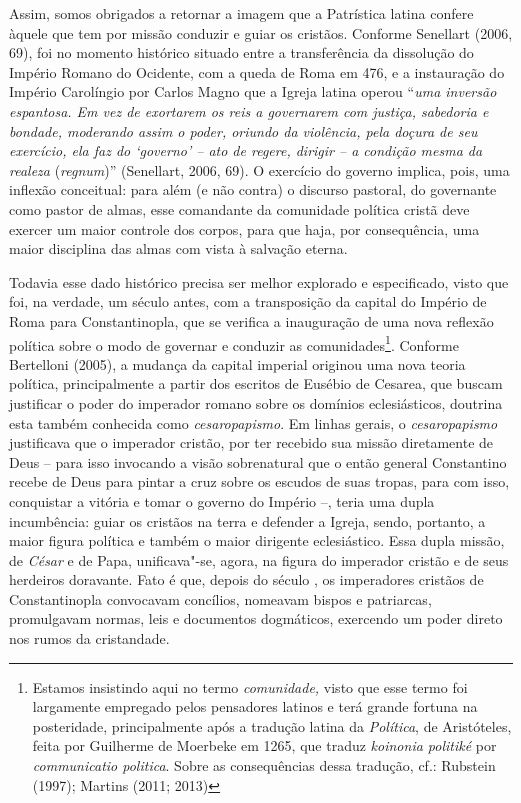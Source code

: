 Assim, somos obrigados a retornar a imagem que a Patrística latina
confere àquele que tem por missão conduzir e guiar os cristãos. Conforme
Senellart (2006, 69), foi no momento histórico situado entre a
transferência da dissolução do Império Romano do Ocidente, com a queda
de Roma em 476, e a instauração do Império Carolíngio por Carlos Magno
que a Igreja latina operou ``\emph{uma inversão espantosa. Em vez de
exortarem os reis a governarem com justiça, sabedoria e bondade,
moderando assim o poder, oriundo da violência, pela doçura de seu
exercício, ela faz do `governo' -- ato de regere, dirigir -- a condição
mesma da realeza} (\emph{regnum})'' (Senellart, 2006, 69). O exercício
do governo implica, pois, uma inflexão conceitual: para além (e não
contra) o discurso pastoral, do governante como pastor de almas, esse
comandante da comunidade política cristã deve exercer um maior controle
dos corpos, para que haja, por consequência, uma maior disciplina das
almas com vista à salvação eterna.

Todavia esse dado histórico precisa ser melhor explorado e especificado,
visto que foi, na verdade, um século antes, com a transposição da
capital do Império de Roma para Constantinopla, que se verifica a
inauguração de uma nova reflexão política sobre o modo de governar e
conduzir as comunidades\footnote{Estamos insistindo aqui no termo
  \emph{comunidade,} visto que esse termo foi largamente empregado pelos
  pensadores latinos e terá grande fortuna na posteridade,
  principalmente após a tradução latina da \emph{Política}, de
  Aristóteles, feita por Guilherme de Moerbeke em 1265, que traduz
  \emph{koinonia politiké} por \emph{communicatio politica}. Sobre as
  consequências dessa tradução, cf.: Rubstein (1997); Martins (2011;
  2013)}. Conforme Bertelloni (2005), a mudança da capital imperial
originou uma nova teoria política, principalmente a partir dos escritos
de Eusébio de Cesarea, que buscam justificar o poder do imperador romano
sobre os domínios eclesiásticos, doutrina esta também conhecida como
\emph{cesaropapismo}. Em linhas gerais, o \emph{cesaropapismo}
justificava que o imperador cristão, por ter recebido sua missão
diretamente de Deus -- para isso invocando a visão sobrenatural que o
então general Constantino recebe de Deus para pintar a cruz sobre os
escudos de suas tropas, para com isso, conquistar a vitória e tomar o
governo do Império --, teria uma dupla incumbência: guiar os cristãos na
terra e defender a Igreja, sendo, portanto, a maior figura política e
também o maior dirigente eclesiástico. Essa dupla missão, de
\emph{César} e de Papa, unificava"-se, agora, na figura do imperador
cristão e de seus herdeiros doravante. Fato é que, depois do século ,
os imperadores cristãos de Constantinopla convocavam concílios, nomeavam
bispos e patriarcas, promulgavam normas, leis e documentos dogmáticos,
exercendo um poder direto nos rumos da cristandade.

